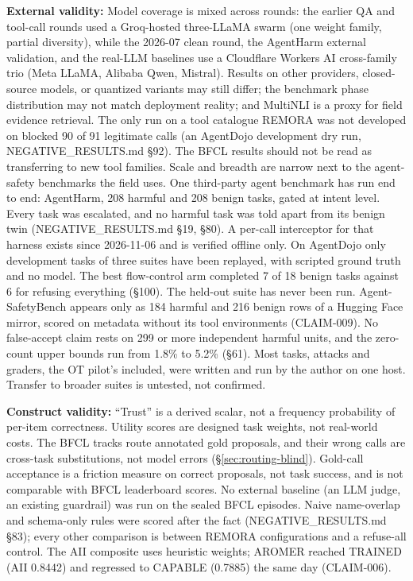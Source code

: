 \documentclass[10pt,twocolumn]{article}
\begin{document}
\textbf{External validity:} Model coverage is mixed across rounds: the
earlier QA and tool-call rounds used a Groq-hosted three-LLaMA swarm
(one weight family, partial diversity), while the 2026-07 clean round,
the AgentHarm external validation, and the real-LLM baselines use a
Cloudflare Workers AI cross-family trio (Meta LLaMA, Alibaba Qwen,
Mistral). Results on other providers, closed-source models, or quantized
variants may still differ; the benchmark phase distribution may not match
deployment reality; and MultiNLI is a proxy for field evidence retrieval.
The only run on a tool catalogue REMORA was not developed on blocked 90 of
91 legitimate calls (an AgentDojo development dry run,
NEGATIVE\_RESULTS.md \S92). The BFCL results should not be read as
transferring to new tool families.
Scale and breadth are narrow next to the agent-safety benchmarks the
field uses. One third-party agent benchmark has run end to end: AgentHarm,
208 harmful and 208 benign tasks, gated at intent level. Every task was
escalated, and no harmful task was told apart from its benign twin
(NEGATIVE\_RESULTS.md \S19, \S80). A per-call interceptor for that
harness exists since 2026-11-06 and is verified offline only. On AgentDojo
only development tasks of three suites have been replayed, with scripted
ground truth and no model. The best flow-control arm completed 7 of 18
benign tasks against 6 for refusing everything (\S100). The held-out
suite has never been run. Agent-SafetyBench appears only as 184 harmful
and 216 benign rows of a Hugging Face mirror, scored on metadata without
its tool environments (CLAIM-009). No false-accept claim rests on 299 or
more independent harmful units, and the zero-count upper bounds run from
1.8\% to 5.2\% (\S61). Most tasks, attacks and graders, the OT pilot's
included, were written and run by the author on one host. Transfer to
broader suites is untested, not confirmed.

\textbf{Construct validity:} ``Trust'' is a derived scalar, not a frequency probability
of per-item correctness. Utility scores are designed task weights, not
real-world costs. The BFCL tracks route annotated gold proposals, and their
wrong calls are cross-task substitutions, not model errors
(\S\ref{sec:routing-blind}). Gold-call acceptance is a friction measure on
correct proposals, not task success, and is not comparable with BFCL
leaderboard scores. No external baseline (an LLM judge, an existing
guardrail) was run on the sealed BFCL episodes. Naive name-overlap and
schema-only rules were scored after the fact (NEGATIVE\_RESULTS.md \S83);
every other comparison is between REMORA configurations and a refuse-all
control. The
AII composite uses heuristic weights; AROMER reached TRAINED (AII 0.8442)
and regressed to CAPABLE (0.7885) the same day (CLAIM-006).
\end{document}
